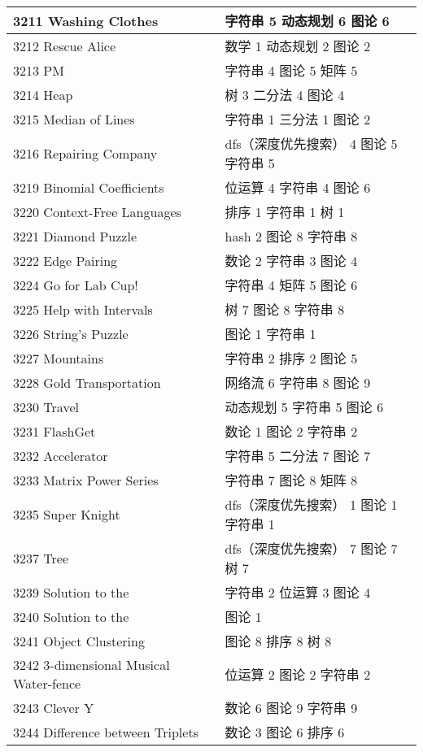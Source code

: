 \begin{longtable}{| p{} | p{} |}
 3211 Washing Clothes  & 字符串 5 动态规划 6 图论 6 \\ \hline
 3212 Rescue Alice  & 数学 1 动态规划 2 图论 2 \\ \hline
 3213 PM  & 字符串 4 图论 5 矩阵 5 \\ \hline
 3214 Heap  & 树 3 二分法 4 图论 4 \\ \hline
 3215 Median of Lines  & 字符串 1 三分法 1 图论 2 \\ \hline
 3216 Repairing Company  & dfs（深度优先搜索） 4 图论 5 字符串 5 \\ \hline
 3219 Binomial Coefficients  & 位运算 4 字符串 4 图论 6 \\ \hline
 3220 Context-Free Languages  & 排序 1 字符串 1 树 1 \\ \hline
 3221 Diamond Puzzle  & hash 2 图论 8 字符串 8 \\ \hline
 3222 Edge Pairing  & 数论 2 字符串 3 图论 4 \\ \hline
 3224 Go for Lab Cup!  & 字符串 4 矩阵 5 图论 6 \\ \hline
 3225 Help with Intervals  & 树 7 图论 8 字符串 8 \\ \hline
 3226 String's Puzzle  & 图论 1 字符串 1 \\ \hline
 3227 Mountains  & 字符串 2 排序 2 图论 5 \\ \hline
 3228 Gold Transportation  & 网络流 6 字符串 8 图论 9 \\ \hline
 3230 Travel  & 动态规划 5 字符串 5 图论 6 \\ \hline
 3231 FlashGet  & 数论 1 图论 2 字符串 2 \\ \hline
 3232 Accelerator  & 字符串 5 二分法 7 图论 7 \\ \hline
 3233 Matrix Power Series  & 字符串 7 图论 8 矩阵 8 \\ \hline
 3235 Super Knight  & dfs（深度优先搜索） 1 图论 1 字符串 1 \\ \hline
 3237 Tree  & dfs（深度优先搜索） 7 图论 7 树 7 \\ \hline
 3239 Solution to the   & 字符串 2 位运算 3 图论 4 \\ \hline
 3240 Solution to the   & 图论 1 \\ \hline
 3241 Object Clustering  & 图论 8 排序 8 树 8 \\ \hline
 3242 3-dimensional Musical Water-fence  & 位运算 2 图论 2 字符串 2 \\ \hline
 3243 Clever Y  & 数论 6 图论 9 字符串 9 \\ \hline
 3244 Difference between Triplets  & 数论 3 图论 6 排序 6 \\ \hline

\end{longtable}
